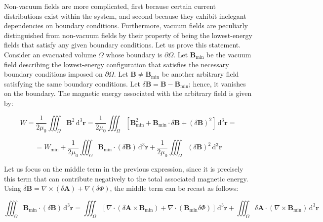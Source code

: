 \quad Non-vacuum fields are more complicated, first because certain current distributions exist within the system, and second because they exhibit inelegant dependencies on boundary conditions. Furthermore, vacuum fields are peculiarly distinguished from non-vacuum fields by their property of being the lowest-energy fields that satisfy any given boundary conditions. Let us prove this statement. Consider an evacuated volume $\Omega$ whose boundary is $\partial\Omega$. Let $\mathbf{B}_\text{min}$ be the vacuum field describing the lowest-energy configuration that satisfies the necessary boundary conditions imposed on $\partial\Omega$. Let $\mathbf{B}\neq\mathbf{B}_\text{min}$ be another arbitrary field satisfying the same boundary conditions. Let $\delta\mathbf{B}=\mathbf{B}-\mathbf{B}_\text{min}$; hence, it vanishes on the boundary. The magnetic energy associated with the arbitrary field is given by:

\begin{equation}
    W=\frac{1}{2\mu_0}\iiint_{\Omega}\mathbf{B}^2\,\mathrm{d}^3\mathbf{r}=\frac{1}{2\mu_0}\iiint_{\Omega}\left[\mathbf{B}_\text{min}^2+\mathbf{B}_\text{min}\cdot\delta\mathbf{B}+(\delta\mathbf{B})^2\right]\,\mathrm{d}^3\mathbf{r}=
\end{equation}

\begin{equation}
    \label{eq-mhd-3}
    =W_\text{min}+\frac{1}{2\mu_0}\iiint_\Omega\mathbf{B}_\text{min}\cdot(\delta\mathbf{B})\,\mathrm{d}^3\mathbf{r}+\frac{1}{2\mu_0}\iiint_\Omega(\delta\mathbf{B})^2\,\mathrm{d}^3\mathbf{r}
\end{equation}

Let us focus on the middle term in the previous expression, since it is precisely this term that can contribute negatively to the total associated magnetic energy. Using $\delta\mathbf{B}=\nabla\times(\delta\mathbf{A})+\nabla(\delta\Phi)$, the middle term can be recast as follows:

\begin{equation}
    \iiint_\Omega\mathbf{B}_\text{min}\cdot(\delta\mathbf{B})\,\mathrm{d}^3\mathbf{r}=\iiint_{\Omega}\left[\nabla\cdot\left(\delta\mathbf{A}\times\mathbf{B}_\text{min}\right)+\nabla\cdot(\mathbf{B}_\text{min}\delta\Phi)\right]\,\mathrm{d}^3\mathbf{r}+\iiint_\Omega\delta\mathbf{A}\cdot(\nabla\times\mathbf{B}_\text{min})\,\mathrm{d}^3\mathbf{r}
\end{equation}

